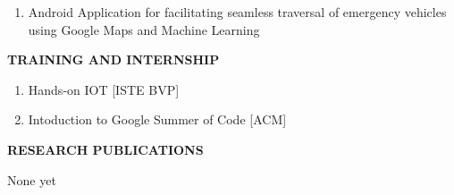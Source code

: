 \documentclass[10pt]{article}
\begin{document}
\begin{minipage}{\textwidth}
{{\begin{enumerate}
\color{black} \item Android Application for facilitating seamless traversal of emergency vehicles using Google Maps and Machine Learning\\




\end{enumerate}
}}
\end{minipage}


\begin{minipage}{\textwidth}
\vspace{5mm}
\begin{huge}
\textbf{\color{theme}TRAINING AND INTERNSHIP}
\end{huge}
\begin{mdframed}[backgroundcolor=theme]
\end{mdframed}

\vspace{1mm}

\color{black}\normalsize{{
\begin{enumerate}
\item Hands-on IOT [ISTE BVP]\\
\item Intoduction to Google Summer of Code [ACM]
\end{enumerate}
}}
\end{minipage}


\begin{minipage}{\textwidth}
\vspace{5mm}
\begin{huge}
\textbf{\color{theme}RESEARCH PUBLICATIONS}
\end{huge}
\begin{mdframed}[backgroundcolor=theme]
\end{mdframed}

\vspace{1mm}

\color{black}\normalsize{{
None yet

}}
\end{minipage}

\vspace{5mm}
\end{document}
